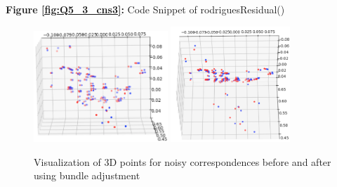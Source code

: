 \begin{your_solution}[title=Q5.3 continued,height=9.5cm,width=\linewidth]
\begin{minipage}{0.5\linewidth}
		\textbf{Figure \ref{fig:Q5_3_cns3}:} Code Snippet of rodriguesResidual()
		\label{fig:Q5_3_cns3}         %
	\end{minipage}
	
\end{your_solution}

\begin{figure}[h!]
    \centering
    \includegraphics[width=0.45\textwidth]{images/q5_3.png}
    \includegraphics[width=0.4\textwidth]{images/q5_3b.png}
\caption{Visualization of 3D points for noisy correspondences before and after using bundle
adjustment}
    \label{fig:q5}
\end{figure}